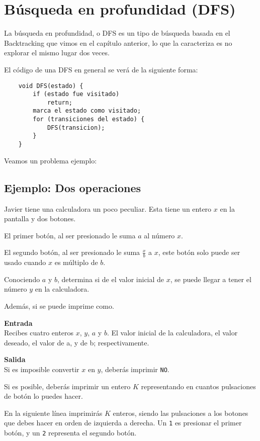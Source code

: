 \chapter{Búsqueda en profundidad (DFS)}
La búsqueda en profundidad, o DFS es un tipo de búsqueda basada en el Backtracking que vimos en el capítulo anterior, lo que la caracteriza es no explorar el mismo lugar dos veces.

El código de una DFS en general se verá de la siguiente forma:

\begin{lstlisting}
	void DFS(estado) {		
		if (estado fue visitado)
			return;
		marca el estado como visitado;
		for (transiciones del estado) {
			DFS(transicion);
		}
	}
\end{lstlisting}

Veamos un problema ejemplo:

\section*{Ejemplo: Dos operaciones}
Javier tiene una calculadora un poco peculiar. Esta tiene un entero \(x\) en la pantalla y dos botones.
\begin{plimits}
	\item El primer botón, al ser presionado le suma \(a\) al número \(x\).
	\item El segundo botón, al ser presionado le suma \(\frac{x}{b}\) a \(x\),  este botón solo puede ser usado cuando \(x\) es múltiplo de \(b\).		
\end{plimits}

Conociendo \(a\) y \(b\), determina si de el valor inicial de \(x\), se puede llegar a tener el número \(y\) en la calculadora.

Además, si se puede imprime como.

\textbf{Entrada}\\
Recibes cuatro enteros \(x\), \(y\), \(a\) y \(b\). El valor inicial de la calculadora, el valor deseado, el valor de a, y de b; respectivamente.

\textbf{Salida}\\
Si es imposible convertir \(x\) en \(y\), deberás imprimir \verb|NO|.

Si es posible, deberás imprimir un entero \(K\) representando en cuantos pulsaciones de botón lo puedes hacer.

En la siguiente línea imprimirás \(K\) enteros, siendo las pulsaciones a los botones que debes hacer en orden de izquierda a derecha. Un \verb|1| es presionar el primer botón, y un \verb|2| representa el segundo botón.

